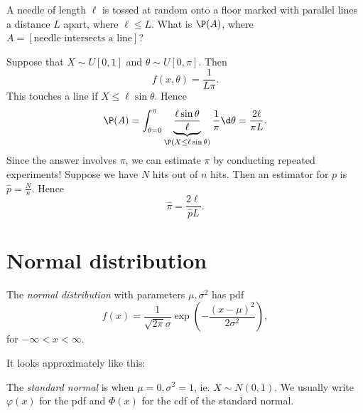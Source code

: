 \documentclass[a4paper]{article}
\begin{document}
\begin{eg}
  A needle of length $\ell$ is tossed at random onto a floor marked with parallel lines a distance $L$ apart, where $\ell \leq L$. What is $\P(A)$, where $A = [\text{needle intersects a line}]$?  
  \begin{center}
  \end{center}
  Suppose that $X\sim U[0, 1]$ and $\theta\sim U[0, \pi]$. Then
  \[
    f(x, \theta) = \frac{1}{L\pi}.
  \]
  This touches a line if $X \leq \ell \sin \theta$. Hence
  \[
    \P(A) = \int_{\theta = 0}^\pi \underbrace{\frac{\ell \sin \theta}{\ell}}_{\P(X \leq \ell\sin \theta)}\frac{1}{\pi}\d \theta = \frac{2\ell }{\pi L}.
  \]
  Since the answer involves $\pi$, we can estimate $\pi$ by conducting repeated experiments! Suppose we have $N$ hits out of $n$ hits. Then an estimator for $p$ is $\hat{p} = \frac{N}{n}$. Hence
  \[
    \hat{\pi} = \frac{2\ell}{\hat{p}L}.
  \]
\end{eg}
\section{Normal distribution}
\begin{defi}
  The \emph{normal distribution} with parameters $\mu, \sigma^2$ has pdf
  \[
    f(x) = \frac{1}{\sqrt{2 \pi}\sigma}\exp\left(-\frac{(x - \mu)^2}{2\sigma^2}\right),
  \]
  for $-\infty < x < \infty$.

  It looks approximately like this: 
  \begin{center}
  \end{center}
  The \emph{standard normal} is when $\mu = 0, \sigma^2 = 1$, ie. $X\sim N(0, 1)$.
  We usually write $\varphi(x)$ for the pdf and $\Phi(x)$ for the cdf of the standard normal.
\end{defi}
\end{document}
